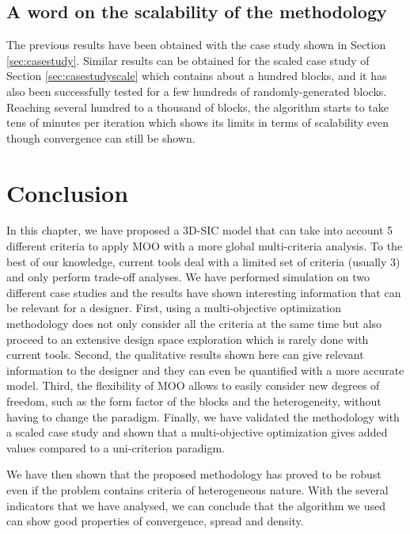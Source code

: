 \subsection{A word on the scalability of the methodology}
The previous results have been obtained with the case study shown in Section \ref{sec:casestudy}. Similar results can be obtained for the scaled case study of Section \ref{sec:casestudyscale} which contains about a hundred blocks, and it has also been successfully tested for a few hundreds of randomly-generated blocks. Reaching several hundred to a thousand of blocks, the algorithm starts to take tens of minutes per iteration which shows its limits in terms of scalability even though convergence can still be shown.

\section{Conclusion}

In this chapter, we have proposed a 3D-SIC model that can take into account 5 different criteria to apply MOO with a more global multi-criteria analysis. To the best of our knowledge, current tools deal with a limited set of criteria (usually 3) and only perform trade-off analyses. We have performed simulation on two different case studies and the results have shown interesting information that can be relevant for a designer. First, using a multi-objective optimization methodology does not only consider all the criteria at the same time but also proceed to an extensive design space exploration which is rarely done with current tools. Second, the qualitative results shown here can give relevant information to the designer and they can even be quantified with a more accurate model. Third, the flexibility of MOO allows to easily consider new degrees of freedom, such as the form factor of the blocks and the heterogeneity, without having to change the paradigm. Finally, we have validated the methodology with a scaled case study and shown that a multi-objective optimization gives added values compared to a uni-criterion paradigm.

We have then shown that the proposed methodology has proved to be robust even if the problem contains criteria of heterogeneous nature. With the several indicators that we have analysed, we can conclude that the algorithm we used can show good properties of convergence, spread and density.

